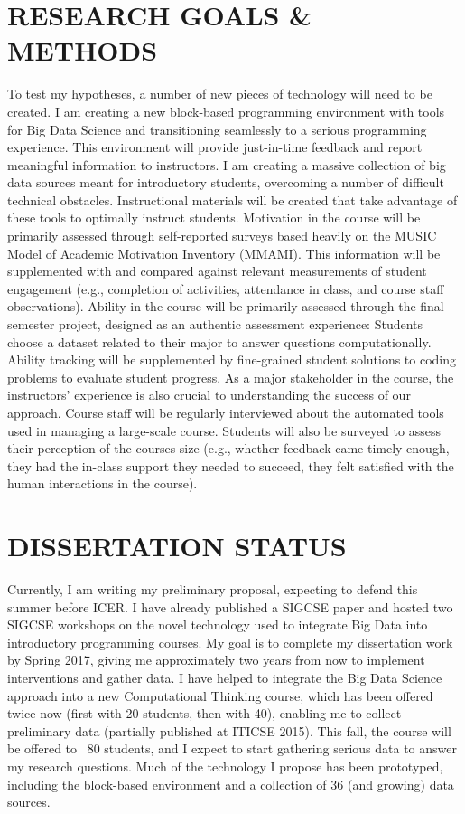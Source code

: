 \documentclass{sig-alternate}
\begin{document}
\section{RESEARCH GOALS \& METHODS}
To test my hypotheses, a number of new pieces of technology will need to be created. I am creating a new block-based programming environment with tools for Big Data Science and transitioning seamlessly to a serious programming experience. This environment will provide just-in-time feedback and report meaningful information to instructors. I am creating a massive collection of big data sources meant for introductory students, overcoming a number of difficult technical obstacles. Instructional materials will be created that take advantage of these tools to optimally instruct students.
Motivation in the course will be primarily assessed through self-reported surveys based heavily on the MUSIC Model of Academic Motivation Inventory (MMAMI). This information will be supplemented with and compared against relevant measurements of student engagement (e.g., completion of activities, attendance in class, and course staff observations).
Ability in the course will be primarily assessed through the final semester project, designed as an authentic assessment experience: Students choose a dataset related to their major to answer questions computationally. Ability tracking will be supplemented by fine-grained student solutions to coding problems to evaluate student progress.
As a major stakeholder in the course, the instructors' experience is also crucial to understanding the success of our approach. Course staff will be regularly interviewed about the automated tools used in managing a large-scale course. Students will also be surveyed to assess their perception of the courses size (e.g., whether feedback came timely enough, they had the in-class support they needed to succeed, they felt satisfied with the human interactions in the course).


\section{DISSERTATION STATUS}
Currently, I am writing my preliminary proposal, expecting to defend this summer before ICER. I have already published a SIGCSE paper and hosted two SIGCSE workshops on the novel technology used to integrate Big Data into introductory programming courses. My goal is to complete my dissertation work by Spring 2017, giving me approximately two years from now to implement interventions and gather data.
I have helped to integrate the Big Data Science approach into a new Computational Thinking course, which has been offered twice now (first with 20 students, then with 40), enabling me to collect preliminary data (partially published at ITICSE 2015). This fall, the course will be offered to ~80 students, and I expect to start gathering serious data to answer my research questions.  Much of the technology I propose has been prototyped, including the block-based environment and a collection of 36 (and growing) data sources. 
\end{document}
